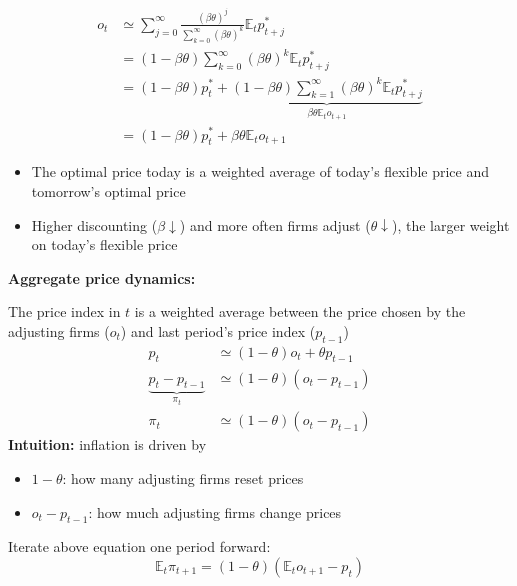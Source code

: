 \documentclass{article}
\begin{document}
\begin{align*}
    o_t&\simeq\sum_{j=0}^{\infty}\frac{(\beta\theta)^j}{\sum_{k=0}^{\infty}(\beta\theta)^k}\mathbb{E}_tp_{t+j}^* \\
    &=(1-\beta\theta) \sum_{k=0}^{\infty}(\beta\theta)^k\mathbb{E}_tp_{t+j}^* \\
    &=(1-\beta\theta)p_t^*+
    \underbrace{(1-\beta\theta) \sum_{k=1}^{\infty}(\beta\theta)^k\mathbb{E}_tp_{t+j}^*}_{\beta\theta\mathbb{E}_to_{t+1}} \\
    &=(1-\beta\theta)p_t^* + \beta\theta\mathbb{E}_to_{t+1}
\end{align*}
\begin{itemize}
    \item The optimal price today is a weighted average of today's flexible price and tomorrow's optimal price
    \item Higher discounting ($\beta\downarrow$) and more often firms adjust ($\theta\downarrow$), the larger weight on today's flexible price
\end{itemize}


\textbf{Aggregate price dynamics:}

The price index in $t$ is a weighted average between the price chosen by the adjusting firms ($o_t$) and last period's price index ($p_{t-1}$)
\begin{align*}
    p_t &\simeq (1-\theta)o_t + \theta p_{t-1} \\
    \underbrace{p_t - p_{t-1}}_{\pi_t} &\simeq (1-\theta)(o_t-p_{t-1}) \\
    \pi_t & \simeq (1-\theta)(o_t-p_{t-1})
\end{align*}
\textbf{Intuition:} inflation is driven by
\begin{itemize}
    \item $1-\theta$: how many adjusting firms reset prices
    \item $o_t-p_{t-1}$: how much adjusting firms change prices
\end{itemize}
Iterate above equation one period forward:
\begin{equation*}
    \mathbb{E}_t\pi_{t+1}=(1-\theta)(\mathbb{E}_to_{t+1}-p_t)
\end{equation*}
\end{document}
